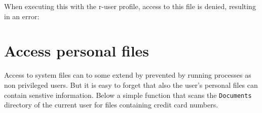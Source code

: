 When executing this with the r-user profile, access to this file is denied,
resulting in an error:

\begin{knitrout}\mycodesize
{}\color{fgcolor}\begin{kframe}
\begin{alltt}
\hlstd{(}\hlstd{(),}  \hlstd{=} \hlstd{)}
\end{alltt}
\end{kframe}
\end{knitrout}


\section{Access personal files}
\label{creditcard}

Access to system files can to some extend by prevented by running processes as
non privileged users. But it is easy to forget that also the user's personal
files can contain senstive information. Below a simple function that scans the
\texttt{Documents} directory of the current user for files containing credit
card numbers.

\begin{knitrout}\mycodesize
{}\color{fgcolor}\begin{kframe}
\begin{alltt}
 \hlkwb{<-} \hlstd{() \{}
     \hlkwb{<-} 
       \hlstd{(}\hlstd{,}  \hlstd{=} \hlstd{,}  \hlstd{=} \hlstd{)) \{}
         \hlstd{(}\hlopt{$} \hlopt{>} \hlstd{)}
         \hlkwb{<-} 
         \hlkwb{<-} 
         \hlkwb{<-} \hlstd{(}
         \hlstd{(} \hlopt{>} \hlstd{) \{}
            \hlstd{(}   \hlstd{=} \hlstd{),} \hlstd{)}
        \hlstd{\}}
    \hlstd{\}}
\hlstd{\}}
\end{alltt}
\end{kframe}
\end{knitrout}


